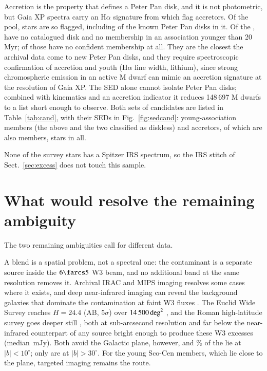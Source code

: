 \documentclass{aa}
\begin{document}
Accretion is the property that defines a Peter Pan disk, and it is not
photometric, but Gaia XP spectra carry an H$\alpha$ signature from which
\citet{delfini2025} flag accretors. Of the pool, \accN{} stars are so flagged,
including \accKnownPP{} of the \svPoolKnownLow{} known Peter Pan disks in it. Of the \accN, \candA{}
have no catalogued disk and no membership in an association younger than
20\,Myr; \candAnoMem{} of those have no confident membership at all. They are the closest
the archival data come to new Peter Pan disks, and they require spectroscopic
confirmation of accretion and youth (H$\alpha$ line width, lithium), since strong
chromospheric emission in an active M dwarf can mimic an accretion signature at
the resolution of Gaia XP. The SED alone cannot isolate Peter Pan disks; combined
with kinematics and an accretion indicator it reduces 148\,697 M dwarfs to a list
short enough to observe. Both sets of candidates are listed in
Table~\ref{tab:cand}, with their SEDs in Fig.~\ref{fig:sedcand}: \candY{} young-association members (the \xmNew{} above and the two
classified as diskless) and \candA{} accretors, \candYA{} of which are also members, \candN{}
stars in all.

None of the survey stars has a Spitzer IRS spectrum, so the IRS stitch of
Sect.~\ref{sec:excess} does not touch this sample.

\section{What would resolve the remaining ambiguity}
\label{sec:resolve}

The two remaining ambiguities call for different data.

A blend is a spatial problem, not a spectral one: the contaminant is a separate
source inside the $6\farcs5$ W3 beam, and no additional band at the same
resolution removes it. Archival IRAC and MIPS imaging resolves some cases where it
exists, and deep near-infrared imaging can reveal the background galaxies that
dominate the contamination at faint W3 fluxes \citep{kennedy2012}. The Euclid
Wide Survey reaches $H = 24.4$ (AB, $5\sigma$) over $14\,500\,{\rm deg}^2$
\citep{scaramella2022}, and the Roman high-latitude survey goes deeper still
\citep{rotac2025}, both at sub-arcsecond resolution and far below the
near-infrared counterpart of any source bright enough to produce these W3
excesses (median \svWthreeMed\,mJy). Both avoid the Galactic plane, however, and \svLowBPct\% of
the \svPool{} lie at $|b| < 10^\circ$; only \svHighB{} are at $|b| > 30^\circ$. For the young
Sco-Cen members, which lie close to the plane, targeted imaging remains the
route.
\end{document}
